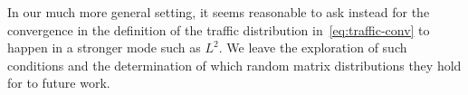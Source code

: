 In our much more general setting, it seems reasonable to ask instead for the convergence in the definition of the traffic distribution in~\cref{eq:traffic-conv} to happen in a stronger mode such as $L^2$.
We leave the exploration of such conditions and the determination of which random matrix distributions they hold for to future work.
